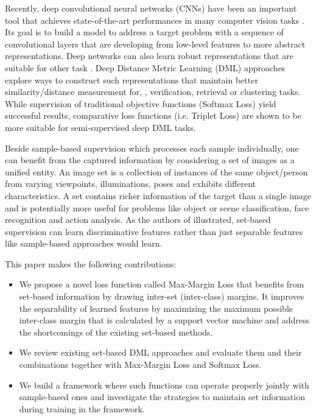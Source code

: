\documentclass[10pt,twocolumn,letterpaper]{article}
\newcommand{\margin}{Max-Margin Loss\xspace}
\begin{document}
Recently, deep convolutional neural networks (CNNs) have been an important tool that achieves state-of-the-art performances in many computer vision tasks \cite{lecun2015deep}. Its goal is to build a model to address a target problem with a sequence of convolutional layers that are developing from low-level features to more abstract representations. Deep networks can also learn robust representations that are suitable for other task \cite{donahue2014decaf, sharif2014cnn, qian2015fine, snoek2015scalable,gecer2016detection}. Deep Distance Metric Learning (DML) approaches explore ways to construct such representations that maintain better similarity/distance measurement for, \eg, verification, retrieval or clustering tasks. While supervision of traditional objective functions (\eg Softmax Loss) yield successful results, comparative loss functions (i.e. Triplet Loss) are shown to be more suitable for semi-supervised deep DML tasks\cite{parkhi2015deep}. 

Beside sample-based supervision which processes each sample individually, one can benefit from the captured information by considering a set of images as a unified entity. An image set is a collection of instances of the same object/person from varying viewpoints, illuminations, poses and exhibits different characteristics. A set contains richer information of the target than a single image and is potentially more useful for problems like object or scene classification, face recognition and action analysis. As the authors of \cite{wen2016discriminative} illustrated, set-based supervision can learn discriminative features rather than just separable features like sample-based approaches would learn.
 
This paper makes the following contributions:

\begin{itemize}
\item We propose a novel loss function called \margin that benefits from set-based information by drawing inter-set (inter-class) margins. It improves the separability of learned features by maximizing the maximum possible inter-class margin that is calculated by a support vector machine and address the shortcomings of the existing set-based methods.
  
\item We review existing set-based DML approaches and evaluate them and their combinations together with \margin and Softmax Loss.
  
\item We build a framework where such functions can operate properly jointly with sample-based ones and investigate the strategies to maintain set information during training in the framework.

\end{itemize}
\end{document}
